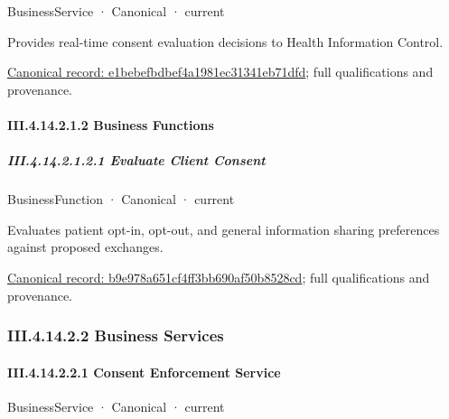 \label{element:e1bebefbdbef4a1981ec31341eb71dfd}
{\small BusinessService · Canonical · current}\par

Provides real-time consent evaluation decisions to Health Information Control.


{\footnotesize \href{../../../../../../../../continuum/business/business-service/e1bebefbdbef4a1981ec31341eb71dfd.md}{Canonical record: e1bebefbdbef4a1981ec31341eb71dfd}; full qualifications and provenance.}\par
\paragraph*{III.4.14.2.1.2 Business Functions}
\label{navigation:III.4.14.2.1.2}

\subparagraph*{III.4.14.2.1.2.1 Evaluate Client Consent}
\label{navigation:III.4.14.2.1.2.1}

\label{element:b9e978a651cf4ff3bb690af50b8528cd}
{\small BusinessFunction · Canonical · current}\par

Evaluates patient opt-in, opt-out, and general information sharing preferences against proposed exchanges.


{\footnotesize \href{../../../../../../../../continuum/business/business-function/b9e978a651cf4ff3bb690af50b8528cd.md}{Canonical record: b9e978a651cf4ff3bb690af50b8528cd}; full qualifications and provenance.}\par
\subsubsection*{III.4.14.2.2 Business Services}
\label{navigation:III.4.14.2.2}

\paragraph*{III.4.14.2.2.1 Consent Enforcement Service}
\label{navigation:III.4.14.2.2.1}

\label{element:67bf392d2dd6464292619e259cc37f8e}
{\small BusinessService · Canonical · current}\par


